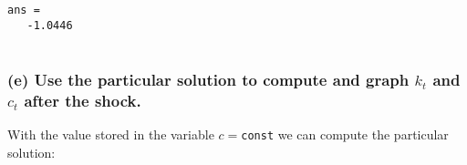\documentclass[10pt,notitlepage,onecolumn,aps,pra]{revtex4-1}
\begin{document}
    \begin{Verbatim}[commandchars=\\\{\}]
ans =
   -1.0446


    \end{Verbatim}

    \hypertarget{e-use-the-particular-solution-to-compute-and-graph-k_t-and-c_t-after-the-shock.}{%
\subsubsection{\texorpdfstring{(e) Use the particular solution to
compute and graph \(k_{t}\) and \(c_{t}\) after the
shock.}{(e) Use the particular solution to compute and graph k\_\{t\} and c\_\{t\} after the shock.}}\label{e-use-the-particular-solution-to-compute-and-graph-k_t-and-c_t-after-the-shock.}}

With the value stored in the variable \(c =\)\texttt{const} we can
compute the particular solution:
\end{document}
